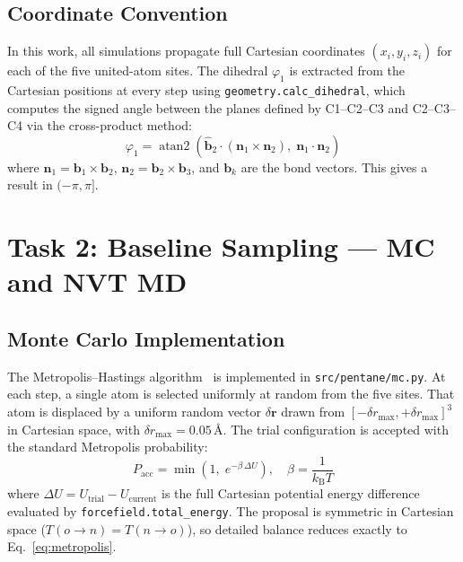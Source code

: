 \documentclass[12pt,a4paper]{article}
\begin{document}
\subsection{Coordinate Convention}
In this work, all simulations propagate full Cartesian coordinates
$(x_i, y_i, z_i)$ for each of the five united-atom sites.  The dihedral
$\varphi_1$ is extracted from the Cartesian positions at every step using
\texttt{geometry.calc\_dihedral}, which computes the signed angle between
the planes defined by C1--C2--C3 and C2--C3--C4 via the cross-product
method:
\begin{equation}
  \varphi_1 = \operatorname{atan2}\!\left(
    \hat{\mathbf{b}}_2 \cdot (\mathbf{n}_1 \times \mathbf{n}_2),\;
    \mathbf{n}_1 \cdot \mathbf{n}_2
  \right)
  \label{eq:dihedral}
\end{equation}
where $\mathbf{n}_1 = \mathbf{b}_1 \times \mathbf{b}_2$,
$\mathbf{n}_2 = \mathbf{b}_2 \times \mathbf{b}_3$, and
$\mathbf{b}_k$ are the bond vectors.  This gives a result in $(-\pi, \pi]$.

\section{Task 2: Baseline Sampling --- MC and NVT MD}
\label{sec:task2}

\subsection{Monte Carlo Implementation}
The Metropolis--Hastings algorithm~\citep{Metropolis1953} is implemented in
\texttt{src/pentane/mc.py}.  At each step, a single atom is selected
uniformly at random from the five sites.  That atom is displaced by a
uniform random vector $\delta\mathbf{r}$ drawn from
$[-\delta r_{\max}, +\delta r_{\max}]^3$ in Cartesian space, with
$\delta r_{\max} = 0.05$\,\AA.  The trial configuration is accepted with
the standard Metropolis probability:
\begin{equation}
  P_{\mathrm{acc}} = \min\!\left(1,\; e^{-\beta\,\Delta U}\right),
  \quad \beta = \frac{1}{k_{\mathrm{B}}T}
  \label{eq:metropolis}
\end{equation}
where $\Delta U = U_{\mathrm{trial}} - U_{\mathrm{current}}$ is the full
Cartesian potential energy difference evaluated by \texttt{forcefield.total\_energy}.
The proposal is symmetric in Cartesian space ($T(o \to n) = T(n \to o)$),
so detailed balance reduces exactly to Eq.~\eqref{eq:metropolis}.
\end{document}
